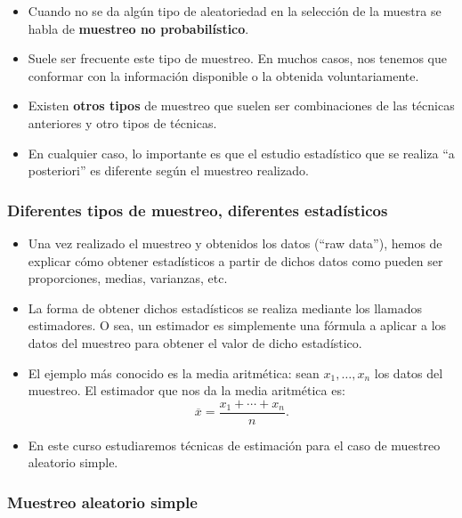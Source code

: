 \begin{frame}
\begin{itemize}
\item Cuando no se da algún tipo de aleatoriedad en la selección de la muestra se habla de  \textbf{muestreo no probabilístico}.
\item Suele ser frecuente este tipo de muestreo. En muchos casos,  nos tenemos que conformar con la información disponible o  
la obtenida voluntariamente.
\item Existen \textbf{otros tipos} de muestreo que suelen ser combinaciones de las técnicas anteriores y otro tipos de técnicas.
\item En cualquier caso, lo importante es que  el estudio estadístico que se realiza ``a posteriori'' es diferente según el muestreo realizado.
\end{itemize}
\end{frame}

\begin{frame}
\frametitle{Diferentes tipos de muestreo, diferentes estadísticos}
\begin{itemize}
\item Una vez realizado el muestreo y obtenidos los datos (``raw data''), hemos de explicar cómo obtener estadísticos a partir de dichos datos como 
pueden ser proporciones, medias, varianzas, etc.
\item La forma de obtener dichos estadísticos se realiza mediante los llamados estimadores. O sea, un estimador es simplemente una fórmula a aplicar 
a los datos del muestreo para obtener el valor de dicho estadístico.
\item El ejemplo más conocido es la media aritmética: sean $x_1,\ldots,x_n$ los datos del muestreo. El estimador que nos da la media aritmética es:
\[
\overline{x}=\frac{x_1+\cdots +x_n}{n}.
\]
\item En este curso estudiaremos técnicas de estimación para el caso de  muestreo aleatorio simple.
\end{itemize}
\end{frame}

\subsubsection{Muestreo aleatorio simple}

